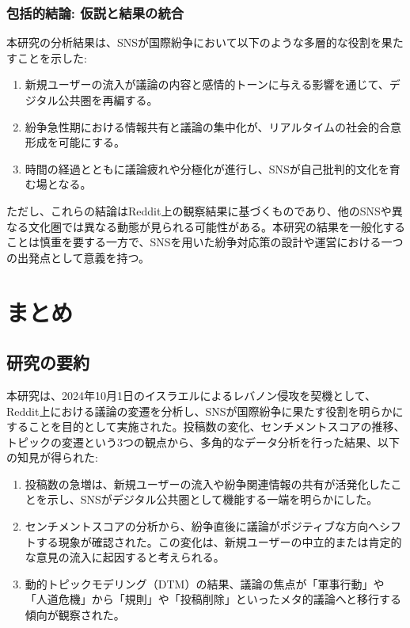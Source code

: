 \documentclass[11pt, a4j]{jreport}
\begin{document}
    \subsection{包括的結論: 仮説と結果の統合}
    本研究の分析結果は、SNSが国際紛争において以下のような多層的な役割を果たすことを示した:
    \begin{enumerate}
        \item 新規ユーザーの流入が議論の内容と感情的トーンに与える影響を通じて、デジタル公共圏を再編する。
        \item 紛争急性期における情報共有と議論の集中化が、リアルタイムの社会的合意形成を可能にする。
        \item 時間の経過とともに議論疲れや分極化が進行し、SNSが自己批判的文化を育む場となる。
    \end{enumerate}

    ただし、これらの結論はReddit上の観察結果に基づくものであり、他のSNSや異なる文化圏では異なる動態が見られる可能性がある。本研究の結果を一般化することは慎重を要する一方で、SNSを用いた紛争対応策の設計や運営における一つの出発点として意義を持つ。

    \chapter{まとめ}

    \section{研究の要約}
    本研究は、2024年10月1日のイスラエルによるレバノン侵攻を契機として、Reddit上における議論の変遷を分析し、SNSが国際紛争に果たす役割を明らかにすることを目的として実施された。投稿数の変化、センチメントスコアの推移、トピックの変遷という3つの観点から、多角的なデータ分析を行った結果、以下の知見が得られた:

    \begin{enumerate}
        \item 投稿数の急増は、新規ユーザーの流入や紛争関連情報の共有が活発化したことを示し、SNSがデジタル公共圏として機能する一端を明らかにした。
        \item センチメントスコアの分析から、紛争直後に議論がポジティブな方向へシフトする現象が確認された。この変化は、新規ユーザーの中立的または肯定的な意見の流入に起因すると考えられる。
        \item 動的トピックモデリング（DTM）の結果、議論の焦点が「軍事行動」や「人道危機」から「規則」や「投稿削除」といったメタ的議論へと移行する傾向が観察された。
    \end{enumerate}
\end{document}
